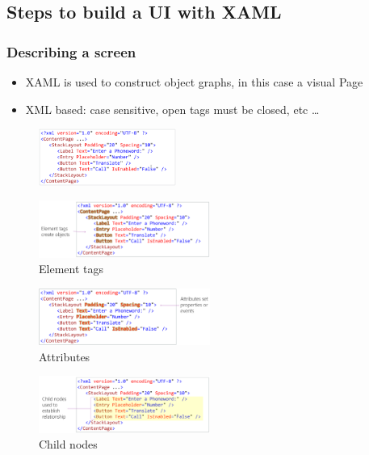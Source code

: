 \documentclass{article}
\begin{document}
\subsection{Steps to build a UI with XAML}

\subsubsection{Describing a screen}

\begin{itemize}
    \item XAML is used to construct object graphs, in this case a visual Page
    \item XML based: case sensitive, open tags must be closed, etc \dots
\end{itemize}

\begin{figure}[H]
    \centering
    \includegraphics[width=0.4\textwidth]{xaml01.png}
    \caption{}
\end{figure}

\begin{figure}[H]
    \centering
    \includegraphics[width=0.5\textwidth]{xaml02.png}
    \caption{Element tags}
\end{figure}

\begin{figure}[H]
    \centering
    \includegraphics[width=0.5\textwidth]{xaml03.png}
    \caption{Attributes}
\end{figure}

\begin{figure}[H]
    \centering
    \includegraphics[width=0.5\textwidth]{xaml04.png}
    \caption{Child nodes}
\end{figure}
\end{document}
